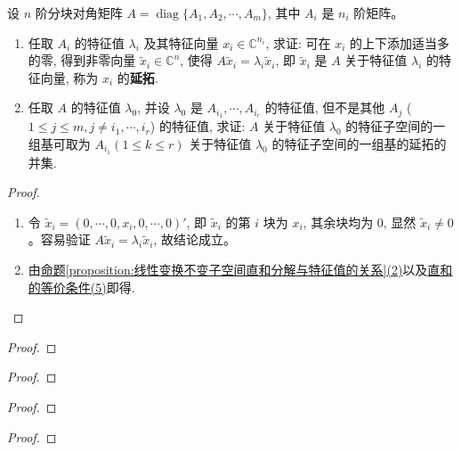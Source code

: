 \documentclass[lang=cn,newtx,10pt,scheme=chinese]{elegantbook}
\begin{document}
\begin{proposition}[特征向量的延拓]\label{proposition:特征向量的延拓}
设 $n$ 阶分块对角矩阵 $A = \operatorname{diag}\{A_1, A_2, \cdots, A_m\}$, 其中 $A_i$ 是 $n_i$ 阶矩阵。
\begin{enumerate}[(1)]
\item 任取 $A_i$ 的特征值 $\lambda_i$ 及其特征向量 $x_i \in \mathbb{C}^{n_i}$, 求证: 可在 $x_i$ 的上下添加适当多的零, 得到非零向量 $\tilde{x}_i \in \mathbb{C}^n$, 使得 $A \tilde{x}_i = \lambda_i \tilde{x}_i$, 即 $\tilde{x}_i$ 是 $A$ 关于特征值 $\lambda_i$ 的特征向量, 称为 $x_i$ 的\textbf{延拓}.

\item 任取 $A$ 的特征值 $\lambda_0$, 并设 $\lambda_0$ 是 $A_{i_1}, \cdots, A_{i_r}$ 的特征值, 但不是其他 $A_j$ ($1 \leq j \leq m, j \neq i_1, \cdots, i_r$) 的特征值, 求证: $A$ 关于特征值 $\lambda_0$ 的特征子空间的一组基可取为 $A_{i_1} (1 \leq k \leq r)$ 关于特征值 $\lambda_0$ 的特征子空间的一组基的延拓的并集.
\end{enumerate} 
\end{proposition}
\begin{proof}
\begin{enumerate}[(1)]
\item 令 $\tilde{x}_i = (0, \cdots, 0, x_i, 0, \cdots, 0)'$, 即 $\tilde{x}_i$ 的第 $i$ 块为 $x_i$, 其余块均为 $0$, 显然 $\tilde{x}_i \neq 0$。容易验证 $A \tilde{x}_i = \lambda_i \tilde{x}_i$, 故结论成立。

\item 由\hyperref[proposition:线性变换不变子空间直和分解与特征值的关系]{命题\ref{proposition:线性变换不变子空间直和分解与特征值的关系}(2)}以及\hyperref[theorem:直和的等价条件]{直和的等价条件(5)}即得.
\end{enumerate}
\end{proof}

\begin{example}

\end{example}
\begin{proof}

\end{proof}

\begin{example}

\end{example}
\begin{proof}

\end{proof}

\begin{example}

\end{example}
\begin{proof}

\end{proof}

\begin{example}

\end{example}
\begin{proof}

\end{proof}
\end{document}
